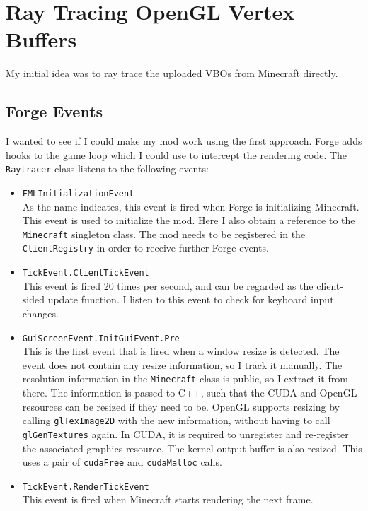 \documentclass[]{article}
\begin{document}
\section{Ray Tracing OpenGL Vertex Buffers}
My initial idea was to ray trace the uploaded VBOs from Minecraft directly.

\subsection{Forge Events}
I wanted to see if I could make my mod work using the first approach.
Forge adds hooks to the game loop which I could use to intercept the rendering code.
The \texttt{Raytracer} class listens to the following events:
\begin{itemize}
  \item \texttt{FMLInitializationEvent} \\
    As the name indicates, this event is fired when Forge is initializing Minecraft.
    This event is used to initialize the mod.
    Here I also obtain a reference to the \texttt{Minecraft} singleton class.
    The mod needs to be registered in the \texttt{ClientRegistry} in order to receive further Forge events.
  \item \texttt{TickEvent.ClientTickEvent} \\
    This event is fired 20 times per second, and can be regarded as the client-sided update function.
    I listen to this event to check for keyboard input changes.
  \item \texttt{GuiScreenEvent.InitGuiEvent.Pre} \\
    This is the first event that is fired when a window resize is detected.
    The event does not contain any resize information, so I track it manually.
    The resolution information in the \texttt{Minecraft} class is public, so I extract it from there.
    The information is passed to C++, such that the CUDA and OpenGL resources can be resized if they need to be.
    OpenGL supports resizing by calling \texttt{glTexImage2D} with the new information, without having to call \texttt{glGenTextures} again.
    In CUDA, it is required to unregister and re-register the associated graphics resource.
    The kernel output buffer is also resized. This uses a pair of \texttt{cudaFree} and \texttt{cudaMalloc} calls.

  \item \texttt{TickEvent.RenderTickEvent} \\
    This event is fired when Minecraft starts rendering the next frame.
    

\end{itemize}
\end{document}
